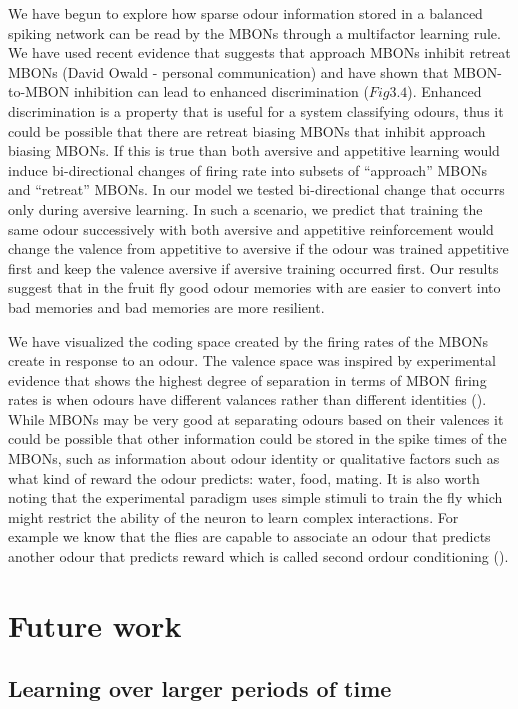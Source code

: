 We have begun to explore how sparse odour information stored in a
balanced spiking network can be read by the MBONs through a multifactor
learning rule. We have used recent evidence that suggests that approach
MBONs inhibit retreat MBONs (David Owald - personal communication)
and have shown that MBON-to-MBON inhibition can lead to enhanced discrimination
($Fig3.4$). Enhanced discrimination is a property that is useful
for a system classifying odours, thus it could be possible that there
are retreat biasing MBONs that inhibit approach biasing MBONs. If
this is true than both aversive and appetitive learning would induce
bi-directional changes of firing rate into subsets of ``approach''
MBONs and ``retreat'' MBONs. In our model we tested bi-directional
change that occurrs only during aversive learning. In such a scenario,
we predict that training the same odour successively with both aversive
and appetitive reinforcement would change the valence from appetitive
to aversive if the odour was trained appetitive first and keep the
valence aversive if aversive training occurred first. Our results
suggest that in the fruit fly good odour memories with are easier
to convert into bad memories and bad memories are more resilient.

We have visualized the coding space created by the firing rates of
the MBONs create in response to an odour. The valence space was inspired
by experimental evidence that shows the highest degree of separation
in terms of MBON firing rates is when odours have different valances
rather than different identities (\citealp{Hige:2015er}). While MBONs
may be very good at separating odours based on their valences it could
be possible that other information could be stored in the spike times
of the MBONs, such as information about odour identity or qualitative
factors such as what kind of reward the odour predicts: water, food,
mating. It is also worth noting that the experimental paradigm uses
simple stimuli to train the fly which might restrict the ability of
the neuron to learn complex interactions. For example we know that
the flies are capable to associate an odour that predicts another
odour that predicts reward which is called second ordour conditioning
(\citet{Wu:2007ie}).


\section{Future work}


\subsection{Learning over larger periods of time}

